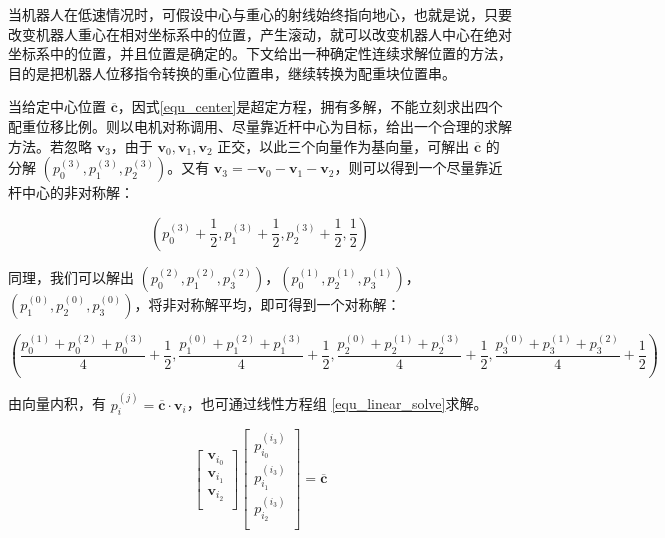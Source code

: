 \documentclass[a4paper]{ctexart}
\numberwithin{equation}{section}
\numberwithin{table}{section}
\numberwithin{figure}{section}
\begin{document}
当机器人在低速情况时，可假设中心与重心的射线始终指向地心，也就是说，只要改变机器人重心在相对坐标系中的位置，产生滚动，就可以改变机器人中心在绝对坐标系中的位置，并且位置是确定的。下文给出一种确定性连续求解位置的方法，目的是把机器人位移指令转换的重心位置串，继续转换为配重块位置串。

当给定中心位置 $\overline{\boldsymbol c}$，因式\ref{equ_center}是超定方程，拥有多解，不能立刻求出四个配重位移比例。则以电机对称调用、尽量靠近杆中心为目标，给出一个合理的求解方法。若忽略 $\boldsymbol v_3$，由于 $\boldsymbol v_0,\boldsymbol v_1,\boldsymbol v_2$ 正交，以此三个向量作为基向量，可解出 $\overline{\boldsymbol c}$ 的分解 $\left(p_0^{(3)},p_1^{(3)},p_2^{(3)}\right)$。又有 $\boldsymbol v_3 = - \boldsymbol v_0 -\boldsymbol v_1-\boldsymbol v_2$，则可以得到一个尽量靠近杆中心的非对称解：

\begin{equation}
  \left(p_0^{(3)} +\frac{1}{2}, p_1^{(3)} +\frac{1}{2}, p_2^{(3)} + \frac{1}{2}, \frac{1}{2}\right)
\end{equation}

同理，我们可以解出 $\left(p_0^{(2)},p_1^{(2)},p_3^{(2)}\right)$，$\left(p_0^{(1)},p_2^{(1)},p_3^{(1)}\right)$，$\left(p_1^{(0)},p_2^{(0)},p_3^{(0)}\right)$，将非对称解平均，即可得到一个对称解：

\begin{equation}
  \left(
    \frac{p_0^{(1)}+p_0^{(2)}+p_0^{(3)}}{4} +\frac{1}{2},
    \frac{p_1^{(0)}+p_1^{(2)}+p_1^{(3)}}{4} +\frac{1}{2},
    \frac{p_2^{(0)}+p_2^{(1)}+p_2^{(3)}}{4} +\frac{1}{2},
    \frac{p_3^{(0)}+p_3^{(1)}+p_3^{(2)}}{4} +\frac{1}{2}
  \right)
\end{equation}

由向量内积，有 $p_i^{(j)} = \overline{\boldsymbol c} \cdot \boldsymbol v_i$，也可通过线性方程组
\ref{equ_linear_solve}求解。

\begin{equation}
  \begin{bmatrix}
    \boldsymbol v_{i_0} \\
    \boldsymbol v_{i_1} \\
    \boldsymbol v_{i_2} \\
  \end{bmatrix}
  \begin{bmatrix}
    p_{i_0}^{(i_3)} \\
    p_{i_1}^{(i_3)} \\
    p_{i_2}^{(i_3)} \\
  \end{bmatrix}
  =
  \overline{\boldsymbol c}
  \label{equ_linear_solve}
\end{equation}
\end{document}
